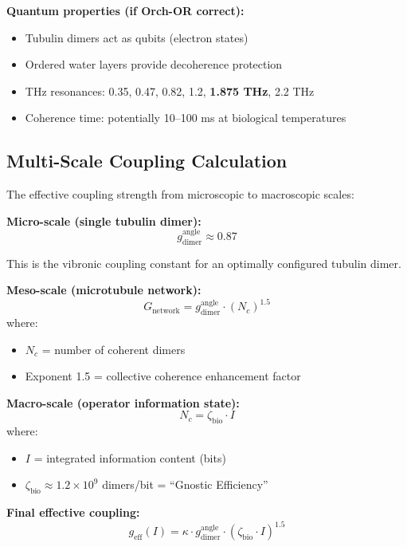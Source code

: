 \textbf{Quantum properties (if Orch-OR correct):}
\begin{itemize}
\item Tubulin dimers act as qubits (electron states)
\item Ordered water layers provide decoherence protection
\item THz resonances: 0.35, 0.47, 0.82, 1.2, \textbf{1.875 THz}, 2.2 THz
\item Coherence time: potentially 10--100 ms at biological temperatures
\end{itemize}

\subsection{Multi-Scale Coupling Calculation}

The effective coupling strength from microscopic to macroscopic scales:

\textbf{Micro-scale (single tubulin dimer):}
\begin{equation}
g_{\text{dimer}}^{\text{angle}} \approx 0.87
\end{equation}

This is the vibronic coupling constant for an optimally configured tubulin dimer.

\textbf{Meso-scale (microtubule network):}
\begin{equation}
G_{\text{network}} = g_{\text{dimer}}^{\text{angle}} \cdot (N_c)^{1.5}
\end{equation}
where:
\begin{itemize}
\item $N_c$ = number of coherent dimers
\item Exponent 1.5 = collective coherence enhancement factor
\end{itemize}

\textbf{Macro-scale (operator information state):}
\begin{equation}
N_c = \zeta_{\text{bio}} \cdot I
\end{equation}
where:
\begin{itemize}
\item $I$ = integrated information content (bits)
\item $\zeta_{\text{bio}} \approx 1.2 \times 10^9$ dimers/bit = ``Gnostic Efficiency''
\end{itemize}

\textbf{Final effective coupling:}
\begin{equation}
g_{\text{eff}}(I) = \kappa \cdot g_{\text{dimer}}^{\text{angle}} \cdot (\zeta_{\text{bio}} \cdot I)^{1.5}
\end{equation}

